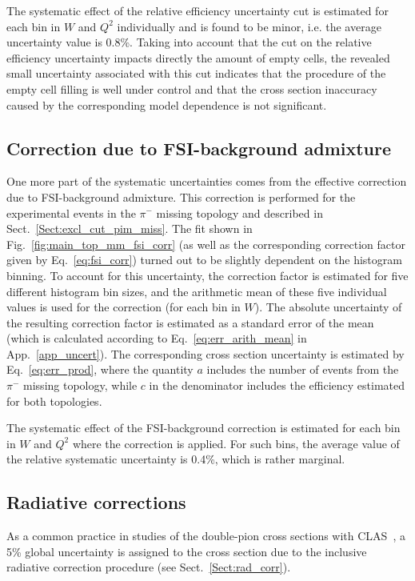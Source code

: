 The systematic effect of the relative efficiency uncertainty cut is estimated for each bin in $W$ and $Q^{2}$ individually and is found to be minor, i.e. the average uncertainty value is 0.8\%. Taking into account that the cut on the relative efficiency uncertainty impacts directly the amount of empty cells, the revealed small uncertainty associated with this cut indicates that the procedure of the empty cell filling is well under control and that the cross section inaccuracy caused by the corresponding model dependence is not significant. 


\subsection*{Correction due to FSI-background admixture}

One more part of the systematic uncertainties comes from the effective correction due to FSI-background admixture. This correction is performed for the experimental events in the $\pi^{-}$ missing topology and described in Sect.~\ref{Sect:excl_cut_pim_miss}. The fit shown in Fig.~\ref{fig:main_top_mm_fsi_corr} (as well as the corresponding correction factor given by Eq.~\eqref{eq:fsi_corr}) turned out to be slightly dependent on the histogram binning. To account for this uncertainty, the correction factor is estimated for five different histogram bin sizes, and the arithmetic mean of these five individual values is used for the correction (for each bin in $W$). The absolute uncertainty of the resulting correction factor is estimated as a standard error of the mean (which is calculated according to Eq.~\eqref{eq:err_arith_mean} in App.~\ref{app_uncert}). The corresponding cross section uncertainty is estimated by Eq.~\eqref{eq:err_prod}, where the quantity $a$ includes the number of events from the $\pi^{-}$ missing topology, while $c$ in the denominator includes the efficiency estimated for both topologies. 

The systematic effect of the FSI-background correction is estimated for each bin in $W$ and $Q^{2}$ where the correction is applied. For such bins, the average value of the relative systematic uncertainty is 0.4\%, which is rather marginal.


\subsection*{Radiative corrections}


As a common practice in studies of the double-pion cross sections with CLAS~\cite{Rip_an_note:2002,Ripani:2002ss,Fed_an_note:2007,Fedotov:2008aa,Isupov:2017lnd,Arjun,Fed_an_note:2017,Fed_paper_2018}, a 5\% global uncertainty is assigned to the cross section due to the inclusive radiative correction procedure (see Sect.~\ref{Sect:rad_corr}).


